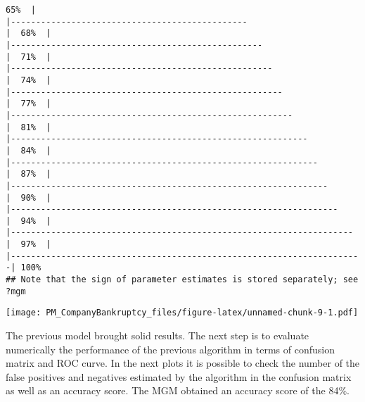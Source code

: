 \documentclass[
]{article}
\begin{document}
\begin{verbatim}
65%  |                                                                              |-----------------------------------------------                       |  68%  |                                                                              |--------------------------------------------------                    |  71%  |                                                                              |----------------------------------------------------                  |  74%  |                                                                              |------------------------------------------------------                |  77%  |                                                                              |--------------------------------------------------------              |  81%  |                                                                              |-----------------------------------------------------------           |  84%  |                                                                              |-------------------------------------------------------------         |  87%  |                                                                              |---------------------------------------------------------------       |  90%  |                                                                              |-----------------------------------------------------------------     |  94%  |                                                                              |--------------------------------------------------------------------  |  97%  |                                                                              |----------------------------------------------------------------------| 100%
## Note that the sign of parameter estimates is stored separately; see ?mgm
\end{verbatim}

\texttt{[image: PM\_CompanyBankruptcy\_files/figure-latex/unnamed-chunk-9-1.pdf]}

The previous model brought solid results. The next step is to evaluate
numerically the performance of the previous algorithm in terms of
confusion matrix and ROC curve. In the next plots it is possible to
check the number of the false positives and negatives estimated by the
algorithm in the confusion matrix as well as an accuracy score. The MGM
obtained an accuracy score of the 84\%.
\end{document}
